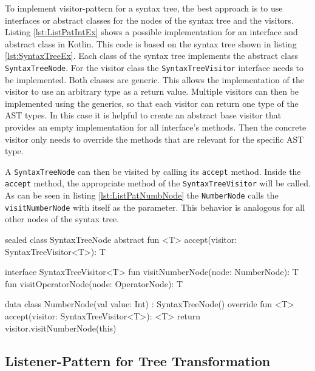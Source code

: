 To implement visitor-pattern for a syntax tree, the best approach is to use interfaces or abstract classes for the nodes of the syntax tree and the visitors. Listing \ref{lst:ListPatIntEx} shows a possible implementation for an interface and abstract class in Kotlin. This code is based on the syntax tree shown in listing \ref{lst:SyntaxTreeEx}. Each class of the syntax tree implements the  abstract class \texttt{SyntaxTreeNode}. For the visitor class the \texttt{SyntaxTreeVisitor} interface needs to be implemented. Both classes are generic. This allows the implementation of the visitor to use an arbitrary type as a return value. Multiple visitors can then be implemented using the generics, so that each visitor can return one type of the AST types. In this case it is helpful to create an abstract base visitor that provides an empty implementation for all interface's methods. Then the concrete visitor only needs to override the methods that are relevant for the specific AST type.  

A \texttt{SyntaxTreeNode} can then be visited by calling its \texttt{accept} method. Inside the \texttt{accept} method, the appropriate method of the \texttt{SyntaxTreeVisitor} will be called. As can be seen in listing \ref{lst:ListPatNumbNode} the \texttt{NumberNode} calls the \texttt{visitNumberNode} with itself as the parameter. This behavior is analogous for all other nodes of the syntax tree. 


\begin{KotlinCode}[float,numbers=none,caption=Interface and abstract class used to implement the visitor-pattern., label=lst:ListPatIntEx]
sealed class SyntaxTreeNode {
    abstract fun <T> accept(visitor: SyntaxTreeVisitor<T>): T
}

interface SyntaxTreeVisitor<T> {
    fun visitNumberNode(node: NumberNode): T
    fun visitOperatorNode(node: OperatorNode): T
}
\end{KotlinCode}


\begin{KotlinCode}[float,numbers=none,caption=Implementation of the \texttt{NumberNode} class inheriting from the \texttt{SyntaxTreeNode}., label=lst:ListPatNumbNode]
  data class NumberNode(val value: Int) : SyntaxTreeNode() {
    override fun <T> accept(visitor: SyntaxTreeVisitor<T>): <T> {
        return visitor.visitNumberNode(this)
    }
}
  \end{KotlinCode}


\subsection{Listener-Pattern for Tree Transformation}


